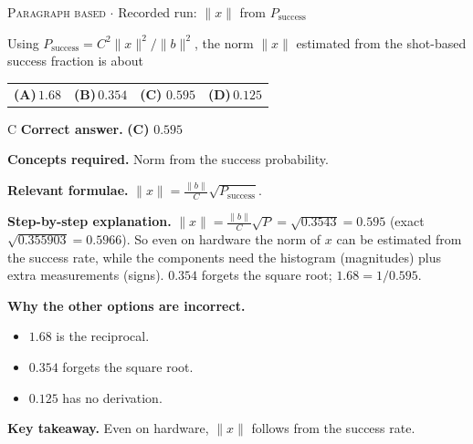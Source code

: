 \documentclass[11pt,a4paper]{article}
\newcommand{\optlabel}[1]{\textbf{(#1)}}
\newcommand{\correctlabel}[1]{\textcolor{okgreen}{\textbf{(#1)}\,\ding{51}}}
\newenvironment{qitem}[1]{\begin{list}{}{\setlength{\leftmargin}{3.3em}\setlength{\labelwidth}{3.1em}%
  \setlength{\labelsep}{0.2em}\setlength{\topsep}{3pt}\setlength{\parsep}{3pt}}\item[\textbf{Q.#1}\hfill]}{\end{list}}
\newcommand{\qsep}{\par\vspace{2pt}{\color{black!15}\hrule}\vspace{4pt}}
\newcommand{\qmeta}[2]{{\footnotesize\color{black!60}\textsc{#1} \;$\cdot$\; #2}\par}
\begin{document}
\begin{qitem}{80}
\qmeta{Paragraph based}{Recorded run: $\|x\|$ from $P_{\text{success}}$}
Using $P_{\text{success}} = C^2\|x\|^2/\|b\|^2$, the norm $\|x\|$ estimated from the shot-based success fraction is about
\par\smallskip\noindent\begin{tabularx}{\linewidth}{@{}*{4}{L}@{}}
\optlabel{A}\,$1.68$ & \optlabel{B}\,$0.354$ & \correctlabel{C}\,$0.595$ & \optlabel{D}\,$0.125$
\end{tabularx}
\end{qitem}
\begin{solbox}{C}
\textbf{\color{brand}Correct answer.} \textcolor{okgreen}{\textbf{(C)}} $0.595$

\textbf{\color{brand}Concepts required.} Norm from the success probability.

\textbf{\color{brand}Relevant formulae.} $\|x\| = \frac{\|b\|}{C}\sqrt{P_{\text{success}}}$.

\textbf{\color{brand}Step-by-step explanation.} $\|x\| = \frac{\|b\|}{C}\sqrt{P} = \sqrt{0.3543} = 0.595$ (exact $\sqrt{0.355903} = 0.5966$). So even on hardware the norm of $x$ can be estimated from the success rate, while the
components need the histogram (magnitudes) plus extra measurements (signs). $0.354$ forgets the square root; $1.68 = 1/0.595$.

\textbf{\color{brand}Why the other options are incorrect.}
\begin{itemize}[leftmargin=2.4em, itemsep=1pt, topsep=2pt]
\item[\textbf{(A)}] $1.68$ is the reciprocal.
\item[\textbf{(B)}] $0.354$ forgets the square root.
\item[\textbf{(D)}] $0.125$ has no derivation.
\end{itemize}
\textbf{\color{brand}Key takeaway.} Even on hardware, $\|x\|$ follows from the success rate.
\end{solbox}
\qsep
\end{document}
